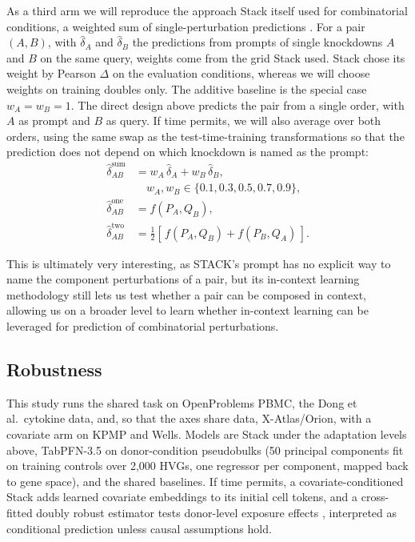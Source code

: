 \documentclass[times, twoside, watermark]{zHenriquesLab-StyleBioRxiv}
\begin{document}
As a third arm we will reproduce the approach Stack itself used for combinatorial conditions, a weighted sum of single-perturbation predictions \cite{dong2026stack}. For a pair $(A,B)$, with $\hat{\delta}_A$ and $\hat{\delta}_B$ the predictions from prompts of single knockdowns $A$ and $B$ on the same query, weights come from the grid Stack used. Stack chose its weight by Pearson $\Delta$ on the evaluation conditions, whereas we will choose weights on training doubles only. The additive baseline is the special case $w_A=w_B=1$. The direct design above predicts the pair from a single order, with $A$ as prompt and $B$ as query. If time permits, we will also average over both orders, using the same swap as the test-time-training transformations so that the prediction does not depend on which knockdown is named as the prompt:
\begin{equation}
\begin{aligned}
\hat{\delta}^{\mathrm{sum}}_{AB} &= w_A\,\hat{\delta}_A + w_B\,\hat{\delta}_B,\\
&\quad w_A,w_B \in \{0.1,0.3,0.5,0.7,0.9\},\\
\hat{\delta}^{\mathrm{one}}_{AB} &= f(P_A, Q_B),\\
\hat{\delta}^{\mathrm{two}}_{AB} &= \tfrac{1}{2}\left[\, f(P_A, Q_B) + f(P_B, Q_A) \,\right].
\end{aligned}
\end{equation}

This is ultimately very interesting, as STACK's prompt has no explicit way to name the component perturbations of a pair, but its in-context learning methodology still lets us test whether a pair can be composed in context, allowing us on a broader level to learn whether in-context learning can be leveraged for prediction of combinatorial perturbations.

\subsection*{Robustness}

This study runs the shared task on OpenProblems PBMC, the Dong et al.\ cytokine data, and, so that the axes share data, X-Atlas/Orion, with a covariate arm on KPMP and Wells. Models are Stack under the adaptation levels above, TabPFN-3.5 on donor-condition pseudobulks (50 principal components fit on training controls over 2,000 HVGs, one regressor per component, mapped back to gene space), and the shared baselines. If time permits, a covariate-conditioned Stack adds learned covariate embeddings to its initial cell tokens, and a cross-fitted doubly robust estimator tests donor-level exposure effects \cite{bang2005doubly}, interpreted as conditional prediction unless causal assumptions hold.
\end{document}
